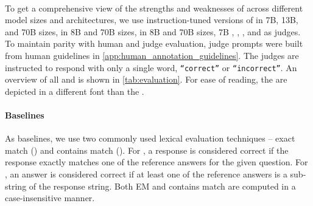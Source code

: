 \paragraph{\Judgemodels}
%
To get a comprehensive view of the strengths and weaknesses of \judgemodels across different model sizes and architectures, we use instruction-tuned versions of  \citep{touvron2023llama} in 7B, 13B, and 70B sizes,  \citep{meta2024llama3} in 8B and 70B sizes,  \citep{dubey2024llama3herdmodels} in 8B and 70B sizes,  7B \citep{jiang2023mistral}, \judge{\gpt} \citep{achiam2023gpt},  \citep{gemma2024gemma}, and  \citep{zhu2023judgelm} as judges. To maintain parity with human and judge evaluation, judge prompts were built from human guidelines in \cref{app:human_annotation_guidelines}. The judges are instructed to respond with only a single word,  \texttt{``correct''} or \texttt{``incorrect''}.
An overview of all \evaluatormodels and \judgemodels is shown in \cref{tab:evaluation}.
For ease of reading, the \judge{\judgemodels} are depicted in a different font than the \eval{\evaluatormodels}.
\paragraph{Baselines} \label{subsec:baselines}
As baselines, we use two commonly used lexical evaluation techniques  -- exact match () and contains match ().
For , a response is considered correct if the response exactly matches one of the reference answers for the given question.
For , an answer is considered correct if at least one of the reference answers is a sub-string of the response string.
Both EM and contains match are computed in a case-insensitive manner.


